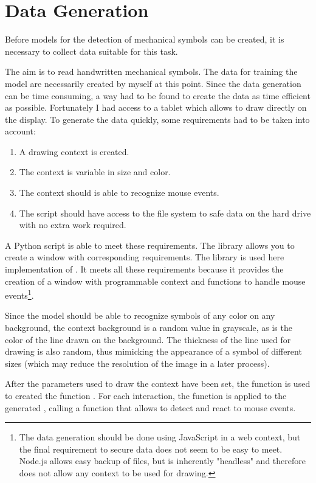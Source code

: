 \section{Data Generation}

Before models for the detection of mechanical symbols can be created, it is necessary to collect data suitable for this task.

The aim is to read handwritten mechanical symbols.
The data for training the model are necessarily created by myself at this point.
Since the data generation can be time consuming, a way had to be found to create the data as time efficient as possible.
Fortunately I had access to a tablet which allows to draw directly on the display.
To generate the data quickly, some requirements had to be taken into account:
\begin{enumerate}
    \item A drawing context is created.
    \item The context is variable in size and color.
    \item The context should is able to recognize mouse events.
    \item The script should have access to the file system to safe data on the hard drive with no extra work required.
\end{enumerate}


A Python script is able to meet these requirements.
The library  \cite{OpenCV2019} allows you to create a window with corresponding requirements. The library  \cite{Heinisuo2019} is used here implementation of .
It meets all these requirements because it provides the creation of a window with programmable context and functions to handle mouse events\footnote{The data generation should be done using JavaScript in a web context, but the final requirement to secure data does not seem to be easy to meet. Node.js allows easy backup of files, but is inherently "headless" and therefore does not allow any context to be used for drawing. }.

Since the model should be able to recognize symbols of any color on any background, the context background is a random value in grayscale, as is the color of the line drawn on the background.
The thickness of the line used for drawing is also random, thus mimicking the appearance of a symbol of different sizes (which may reduce the resolution of the image in a later process).

After the parameters used to draw the context have been set, the function  is used to  created the function . 
For each interaction, the  function is applied to the generated , calling a  function that allows to detect and react to mouse events.


